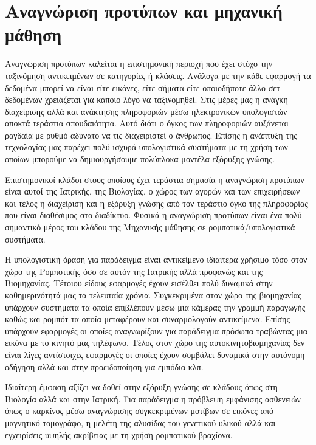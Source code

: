 \section{Αναγνώριση προτύπων και μηχανική μάθηση}
\par
Αναγνώριση προτύπων καλείται η επιστημονική περιοχή που έχει στόχο την ταξινόμηση αντικειμένων σε κατηγορίες ή κλάσεις. Ανάλογα με την κάθε εφαρμογή τα δεδομένα μπορεί να είναι είτε εικόνες, είτε σήματα είτε οποιοδήποτε άλλο σετ δεδομένων χρειάζεται για κάποιο λόγο να ταξινομηθεί. Στις μέρες μας η ανάγκη διαχείρισης αλλά και ανάκτησης πληροφοριών μέσω ηλεκτρονικών υπολογιστών αποκτά τεράστια σπουδαιότητα. Αυτό διότι ο όγκος των πληροφοριών αυξάνεται ραγδαία με ρυθμό αδύνατο να τις διαχειριστεί ο άνθρωπος. Επίσης η ανάπτυξη της τεχνολογίας μας παρέχει πολύ ισχυρά υπολογιστικά συστήματα με τη χρήση των οποίων μπορούμε να δημιουργήσουμε πολύπλοκα μοντέλα εξόρυξης γνώσης. 
\par
Επιστημονικοί κλάδοι στους οποίους έχει τεράστια σημασία η αναγνώριση προτύπων είναι αυτοί της Ιατρικής, της Βιολογίας, ο χώρος των αγορών και των επιχειρήσεων και τέλος η διαχείριση και η εξόρυξη γνώσης από τον τεράστιο όγκο της πληροφορίας που είναι διαθέσιμος στο διαδίκτυο. Φυσικά η αναγνώριση προτύπων είναι ένα πολύ σημαντικό μέρος του κλάδου της Μηχανικής μάθησης σε ρομποτικά/υπολογιστικά συστήματα.
\par
Η υπολογιστική όραση για παράδειγμα είναι αντικείμενο ιδιαίτερα χρήσιμο τόσο στον χώρο της Ρομποτικής όσο σε αυτόν της Ιατρικής αλλά προφανώς και της Βιομηχανίας. Τέτοιου είδους εφαρμογές έχουν εισέλθει πολύ δυναμικά στην καθημερινότητά μας τα τελευταία χρόνια. Συγκεκριμένα στον χώρο της βιομηχανίας υπάρχουν συστήματα τα οποία επιβλέπουν μέσω μια κάμερας την γραμμή παραγωγής καθώς και ρομπότ τα οποία μεταφέρουν και συναρμολογούν αντικείμενα. Επίσης υπάρχουν εφαρμογές οι οποίες αναγνωρίζουν για παράδειγμα πρόσωπα τραβώντας μια εικόνα με το κινητό μας τηλέφωνο. Τέλος στον χώρο της αυτοκινητοβιομηχανίας δεν είναι λίγες αντίστοιχες εφαρμογές οι οποίες έχουν συμβάλει δυναμικά στην αυτόνομη οδήγηση αλλά και στην προειδοποίηση για εμπόδια κλπ.
\par
Ιδιαίτερη έμφαση αξίζει να δοθεί στην εξόρυξη γνώσης σε κλάδους όπως στη Βιολογία αλλά και στην Ιατρική. Για παράδειγμα η πρόβλεψη εμφάνισης ασθενειών όπως ο καρκίνος μέσω αναγνώρισης συγκεκριμένων μοτίβων σε εικόνες από μαγνητικό τομογράφο, η μελέτη της αλυσίδας του γενετικού υλικού αλλά και εγχειρίσεις υψηλής ακρίβειας με τη χρήση ρομποτικού βραχίονα.

